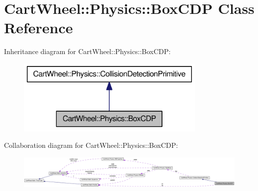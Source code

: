 \hypertarget{classCartWheel_1_1Physics_1_1BoxCDP}{
\section{CartWheel::Physics::BoxCDP Class Reference}
\label{classCartWheel_1_1Physics_1_1BoxCDP}
}


Inheritance diagram for CartWheel::Physics::BoxCDP:\nopagebreak
\begin{figure}[H]
\begin{center}
\leavevmode
\includegraphics[width=258pt]{classCartWheel_1_1Physics_1_1BoxCDP__inherit__graph}
\end{center}
\end{figure}


Collaboration diagram for CartWheel::Physics::BoxCDP:\nopagebreak
\begin{figure}[H]
\begin{center}
\leavevmode
\includegraphics[width=400pt]{classCartWheel_1_1Physics_1_1BoxCDP__coll__graph}
\end{center}
\end{figure}
